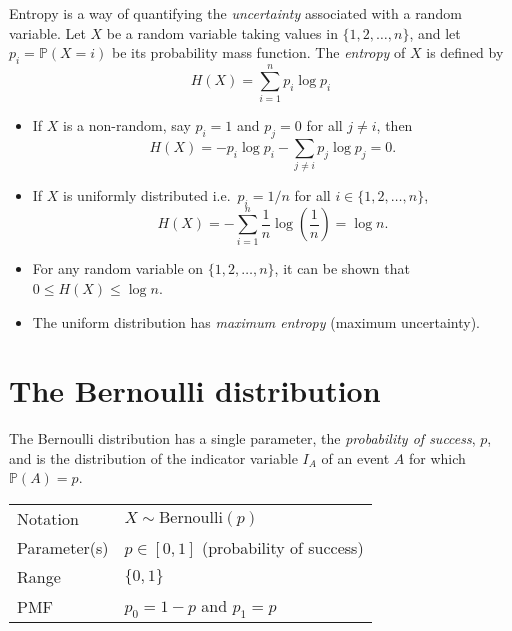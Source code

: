 \documentclass[lecture]{csm}
\newcommand{\prob}{\mathbb{P}}
\def\it{\item}
\def\bit{\begin{itemize}}
\def\eit{\end{itemize}}
\begin{document}
\begin{example}[Entropy]
Entropy is a way of quantifying the \emph{uncertainty} associated with a random variable.
Let $X$ be a random variable taking values in $\{1,2,\ldots,n\}$, and let $p_i=\prob(X=i)$ be its probability mass function. The \emph{entropy} of $X$ is defined by
\[
H(X) = \sum_{i=1}^n p_i\log p_i
\]
\bit
\it If $X$ is a non-random, say $p_i=1$ and $p_j=0$ for all $j\neq i$, then
\[
H(X) = - p_i\log p_i - \sum_{j\neq i} p_j\log p_j = 0.
\]
\it If $X$ is uniformly distributed i.e.\ $p_i=1/n$ for all $i\in\{1,2,\ldots,n\}$, 
\[
H(X) = -\sum_{i=1}^n \frac{1}{n}\log\left(\frac{1}{n}\right) = \log n.
\]
\it
For any random variable on $\{1,2,\ldots,n\}$, it can be shown that $0\leq H(X)\leq \log n$.
\it 
The uniform distribution has \emph{maximum entropy} (maximum uncertainty).
%
\eit
\end{example}

%


\section{The Bernoulli distribution}
The Bernoulli distribution has a single parameter, the \emph{probability of success}, $p$, and is the distribution of the indicator variable $I_A$ of an event $A$ for which $\prob(A)=p$.

\begin{center}
\begin{tabular}{ll}\hline
Notation			& $X\sim\text{Bernoulli}(p)$ \\
Parameter(s)		& $p \in [0,1]$ \quad (probability of success) \\
Range			& $\{0,1\}$ \\
PMF				& $p_0 = 1-p$ and $p_1 = p$ \\ \hline
\end{tabular}
\end{center}
\end{document}
